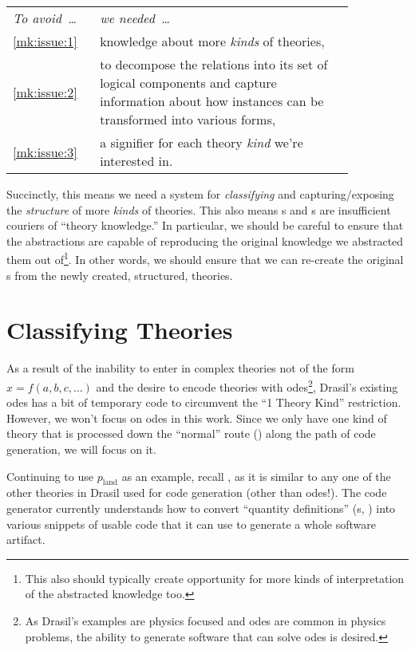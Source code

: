 \begin{longtable}[c]{>{\raggedright}p{0.2\linewidth}>{\raggedright\arraybackslash}p{0.65\linewidth}}
    \textit{To avoid~\ldots{}} & \textit{we needed~\ldots{}}                                    \\
    \ref{mk:issue:1}           & knowledge about more \textit{kinds} of theories,               \\
    \ref{mk:issue:2}           & to decompose the relations into its set of
    logical components and capture information about how instances can be
    transformed into various forms,                                                             \\
    \ref{mk:issue:3}           & a signifier for each theory \textit{kind} we're interested in. \\
\end{longtable}

Succinctly, this means we need a system for \textit{classifying} and
capturing/exposing the \textit{structure} of more \textit{kinds} of theories.
This also means \RelationConcept{}s and \Relation{}s are insufficient couriers
of ``theory knowledge.'' In particular, we should be careful to ensure that the
abstractions are capable of reproducing the original knowledge we abstracted
them out of\footnote{This also should typically create opportunity for more
kinds of interpretation of the abstracted knowledge too.}. In other words, we
should ensure that we can re-create the original \RelationConcept{}s from the
newly created, structured, theories.

\section{Classifying Theories}
\label{chap:modelkinds:sec:classifying-theories}

As a result of the inability to enter in complex theories not of the form \(x =
f(a, b, c, \ldots{})\) and the desire to encode theories with
\acsp{ode}\footnote{As Drasil's examples are physics focused and \acsp{ode} are
    common in physics problems, the ability to generate software that can solve
    \acsp{ode} is desired.}, Drasil's existing \acsp{ode} has a bit of temporary code
to circumvent the ``1 Theory Kind'' restriction. However, we won't focus on
\acsp{ode} in this work. Since we only have one kind of theory that is processed
down the ``normal'' route (\relToQD{}) along the path of code generation, we
will focus on it.

Continuing to use \(p_\text{land}\) as an example, recall
, as it is similar to any one of the other
theories in Drasil used for code generation (other than \acsp{ode}!). The code
generator currently understands how to convert ``quantity definitions''
(\QDefinition{}s, ) into various snippets of
usable code that it can use to generate a whole software artifact.


